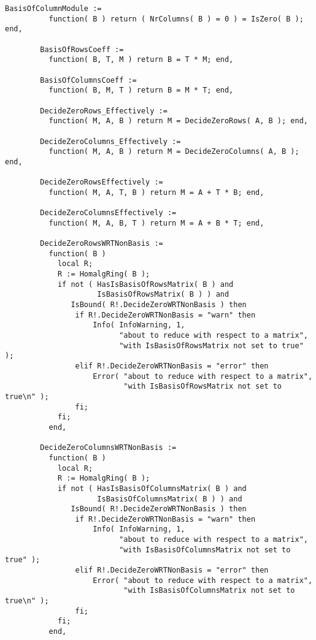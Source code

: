 \documentclass[a4paper,11pt]{report}
\begin{document}
{{\begin{Verbatim}[fontsize=\small,frame=single,label=Code]
        BasisOfColumnModule :=
          function( B ) return ( NrColumns( B ) = 0 ) = IsZero( B ); end,
        
        BasisOfRowsCoeff :=
          function( B, T, M ) return B = T * M; end,
        
        BasisOfColumnsCoeff :=
          function( B, M, T ) return B = M * T; end,
        
        DecideZeroRows_Effectively :=
          function( M, A, B ) return M = DecideZeroRows( A, B ); end,
        
        DecideZeroColumns_Effectively :=
          function( M, A, B ) return M = DecideZeroColumns( A, B ); end,
        
        DecideZeroRowsEffectively :=
          function( M, A, T, B ) return M = A + T * B; end,
        
        DecideZeroColumnsEffectively :=
          function( M, A, B, T ) return M = A + B * T; end,
        
        DecideZeroRowsWRTNonBasis :=
          function( B )
            local R;
            R := HomalgRing( B );
            if not ( HasIsBasisOfRowsMatrix( B ) and
                     IsBasisOfRowsMatrix( B ) ) and
               IsBound( R!.DecideZeroWRTNonBasis ) then
                if R!.DecideZeroWRTNonBasis = "warn" then
                    Info( InfoWarning, 1,
                          "about to reduce with respect to a matrix",
                          "with IsBasisOfRowsMatrix not set to true" );
                elif R!.DecideZeroWRTNonBasis = "error" then
                    Error( "about to reduce with respect to a matrix",
                           "with IsBasisOfRowsMatrix not set to true\n" );
                fi;
            fi;
          end,
        
        DecideZeroColumnsWRTNonBasis :=
          function( B )
            local R;
            R := HomalgRing( B );
            if not ( HasIsBasisOfColumnsMatrix( B ) and
                     IsBasisOfColumnsMatrix( B ) ) and
               IsBound( R!.DecideZeroWRTNonBasis ) then
                if R!.DecideZeroWRTNonBasis = "warn" then
                    Info( InfoWarning, 1,
                          "about to reduce with respect to a matrix",
                          "with IsBasisOfColumnsMatrix not set to true" );
                elif R!.DecideZeroWRTNonBasis = "error" then
                    Error( "about to reduce with respect to a matrix",
                           "with IsBasisOfColumnsMatrix not set to true\n" );
                fi;
            fi;
          end,
        

\end{Verbatim}}}
\end{document}
